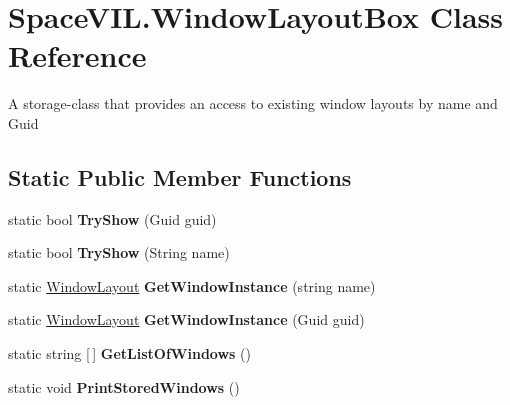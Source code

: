 \hypertarget{class_space_v_i_l_1_1_window_layout_box}{}\section{Space\+V\+I\+L.\+Window\+Layout\+Box Class Reference}
\label{class_space_v_i_l_1_1_window_layout_box}


A storage-\/class that provides an access to existing window layouts by name and Guid  


\subsection*{Static Public Member Functions}
\begin{DoxyCompactItemize}
\item 
\mbox{\label{class_space_v_i_l_1_1_window_layout_box_a36f00b43ac4ad6bd56a8b5a059a68be2}} 
static bool {\bfseries Try\+Show} (Guid guid)
\item 
\mbox{\label{class_space_v_i_l_1_1_window_layout_box_acac7f412dff1ee584bd1a8cd1b5306a8}} 
static bool {\bfseries Try\+Show} (String name)
\item 
\mbox{\label{class_space_v_i_l_1_1_window_layout_box_ae5a5f2b989ae296429224fa1b6839a36}} 
static \mbox{\hyperlink{class_space_v_i_l_1_1_window_layout}{Window\+Layout}} {\bfseries Get\+Window\+Instance} (string name)
\item 
\mbox{\label{class_space_v_i_l_1_1_window_layout_box_a023030cc19d974e0b2fb8fc74bbbbc57}} 
static \mbox{\hyperlink{class_space_v_i_l_1_1_window_layout}{Window\+Layout}} {\bfseries Get\+Window\+Instance} (Guid guid)
\item 
\mbox{\label{class_space_v_i_l_1_1_window_layout_box_a5732dc3cde82ccf3c30c12c7afbfad31}} 
static string \mbox{[}$\,$\mbox{]} {\bfseries Get\+List\+Of\+Windows} ()
\item 
\mbox{\label{class_space_v_i_l_1_1_window_layout_box_ad1efbce585781204ba5e614394525fcc}} 
static void {\bfseries Print\+Stored\+Windows} ()
\end{DoxyCompactItemize}


